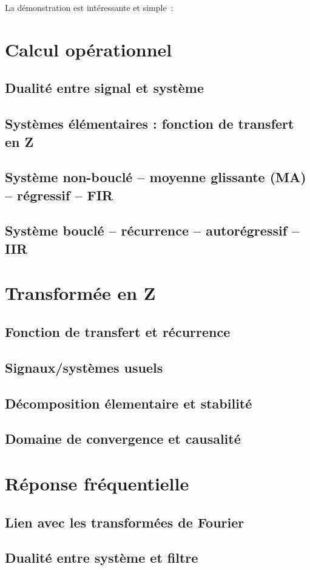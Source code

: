 La démonstration est intéressante et simple~:



\section{Calcul opérationnel}
\subsection{Dualité entre signal et système}
\subsection{Systèmes élémentaires : fonction de transfert en Z}
\subsection{Système non-bouclé -- moyenne glissante (MA) -- régressif --
  FIR}
\subsection{Système bouclé -- récurrence -- autorégressif -- IIR}

\section{Transformée en Z}

\subsection{Fonction de transfert et récurrence}
\subsection{Signaux/systèmes usuels}
\subsection{Décomposition élementaire et stabilité}
\subsection{Domaine de convergence et causalité}

\section{Réponse fréquentielle}
\subsection{Lien avec les transformées de Fourier}
\subsection{Dualité entre système et filtre}





